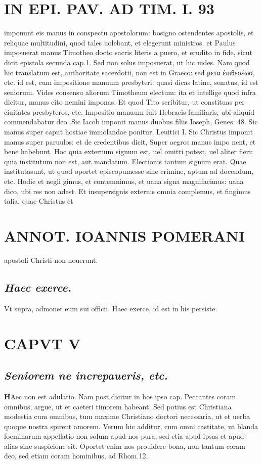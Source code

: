 \documentclass{article}
\begin{document}
\begin{pages}
\section*{IN EPI. PAV. AD TIM. I. 93 }
\marginpar{[ p.93 ]}\pstart imponunt eis manus in conspectu apostolorum: bosigno ostendentes apostolis, et reliquae multitudini, quod tales uolebant, et elegerunt ministros. et Paulus imposuerat manus Timotheo docto sacris literis a puero, et erudito in fide, sicut dicit epistola secunda cap.1. Sed non solus imposuerat, ut hic uides. Nam quod hic translatum est, authoritate sacerdotii, non est in Graeco: sed μετα ἐπιθεσέωσ, etc. id est, cum impositione manuum presbyteri: quasi dicas latine, senatus, id est seniorum. Vides consensu aliorum Timotheum electum: ita et intellige quod infra dicitur, manus cito nemini imponas. Et quod Tito scribitur, ut constituas per ciuitates presbyteros, etc. Impositio manuum fuit Hebraeis familiaris, ubi aliquid commendabatur deo. Sic Iacob imponit manus duobus filiis Ioseph, Genes. 48. Sic manus super caput hostiae immolandae ponitur, Leuitici I. Sic Christus imponit manus super paruulos: et de credentibus dicit, Super aegros manus impo nent, et bene habebunt. Hoc quia externum signum est, uel omitti potest, uel aliter fieri: quia institutum non est, aut mandatum. Electionis tantum signum erat. Quae institutasunt, ut quod oportet episcopumesse sine crimine, aptum ad docendum, etc. Hodie et negli gimus, et contemnimus, et uana signa magnifacimus: uana dico, ubi res non adest. Et insupersignis externis omnia complemus, et fingimus talia, quae Christus et  \pend
\section*{ANNOT. IOANNIS POMERANI }\pstart apostoli Christi non nouerunt.  \pend
{}
{}
\subsection*{\textit{Haec exerce. }}\pstart Vt supra, admonet eum sui officii. Haec exerce, id est in his persiste.  \pend
\endnumbering\beginnumbering\section{CAPVT V}
{}
\subsection*{\textit{Seniorem ne increpaueris, etc. }}\pstart \huge\textbf{H}\normalsize Aec non est adulatio. Nam post dicitur in hos ipso cap. Peccantes coram omnibus, argue, ut et caeteri timorem habeant. Sed potius est Christiana modestia cum omnibus, tum maxime Christiano doctori necessaria, ut et uerba quoque nostra spirent amorem. Verum hic additur, cum omni castitate, ut blanda foeminarum appellatio non solum apud nos pura, sed etia apud ipsas et apud alias sine suspicione sit. Oportet enim nos prouidere bona, non tantum coram deo, sed etiam coram hominibus, ad Rhom.12.  \pend
{}
{}

\end{pages}
\end{document}
